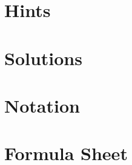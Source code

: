 \documentclass[a4paper,11pt]{scrbook}
\begin{document}
%
%


\chapter{Hints}
\printquestionhints

\chapter{Solutions}
\printsolutions

\chapter*{Notation}
% 

\chapter*{Formula Sheet}
%



\end{document}
